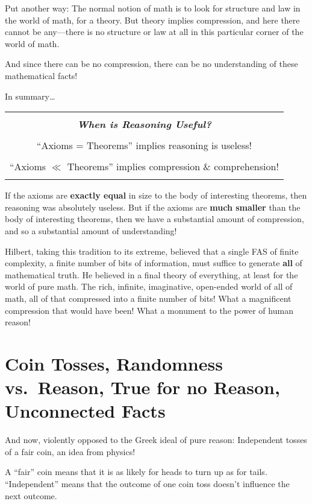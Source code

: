 \documentclass[12pt]{book}
\begin{document}
Put another way: The normal notion of math is to look for structure and law in the world
of math, for a theory.  But theory implies compression, and here there cannot be any---there
is no structure or law at all in this particular corner of the world of math.
 
And since there can be no compression, there can be no understanding of these mathematical facts!
 
In summary\ldots
\begin{center}
\begin{tabular}{|c|}
\hline
\\
\textbf{\emph{\large When is Reasoning Useful?}}
\\ \\
``Axioms = Theorems'' implies reasoning is useless!
\\ \\
``Axioms $\ll$ Theorems'' implies compression \& comprehension!
\\
\\
\hline
\end{tabular}
\end{center}
If the axioms are \textbf{exactly equal} in size to the
body of interesting theorems, then reasoning was absolutely useless.
But if the axioms are \textbf{much smaller} than the body of interesting theorems,
then we have a substantial amount of compression, and so a substantial amount of understanding!
 
Hilbert, taking this tradition to its extreme, 
believed that a single FAS of finite complexity, a finite
number of bits of information, must suffice to generate \textbf{all} of mathematical truth.
He believed in a final theory of everything, at least for the world of pure math.
The rich, infinite, imaginative, open-ended world of all of math, 
all of that compressed into a finite number of bits!
What a magnificent compression that would have been!
What a monument to the power of human reason!

\section*{Coin Tosses, Randomness vs.\ Reason, True for no Reason, Unconnected Facts}

And now, violently opposed to the Greek ideal of pure reason:
Independent tosses of a fair coin, an idea from physics!
 
A ``fair'' coin means that it is as likely for heads to turn up as for tails.
``Independent'' means that the outcome of one coin toss doesn't influence the next outcome.
 
\end{document}
